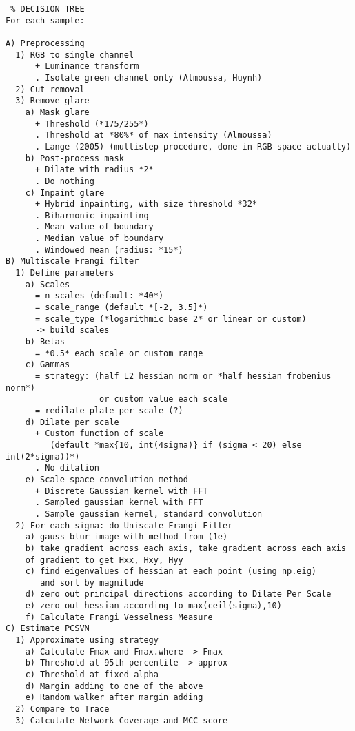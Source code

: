     \begin{spacing}{1}
    \begin{small}
    \begin{verbatim} % DECISION TREE
For each sample:

A) Preprocessing
  1) RGB to single channel
      + Luminance transform
      . Isolate green channel only (Almoussa, Huynh)
  2) Cut removal
  3) Remove glare 
    a) Mask glare
      + Threshold (*175/255*)
      . Threshold at *80%* of max intensity (Almoussa)
      . Lange (2005) (multistep procedure, done in RGB space actually)
    b) Post-process mask
      + Dilate with radius *2*
      . Do nothing
    c) Inpaint glare
      + Hybrid inpainting, with size threshold *32*
      . Biharmonic inpainting
      . Mean value of boundary 
      . Median value of boundary 
      . Windowed mean (radius: *15*)
B) Multiscale Frangi filter
  1) Define parameters
    a) Scales
      = n_scales (default: *40*)
      = scale_range (default *[-2, 3.5]*)
      = scale_type (*logarithmic base 2* or linear or custom)
      -> build scales
    b) Betas
      = *0.5* each scale or custom range
    c) Gammas
      = strategy: (half L2 hessian norm or *half hessian frobenius norm*)
                   or custom value each scale
      = redilate plate per scale (?)
    d) Dilate per scale 
      + Custom function of scale
         (default *max{10, int(4sigma)} if (sigma < 20) else int(2*sigma))*)
      . No dilation
    e) Scale space convolution method
      + Discrete Gaussian kernel with FFT
      . Sampled gaussian kernel with FFT
      . Sample gaussian kernel, standard convolution
  2) For each sigma: do Uniscale Frangi Filter
    a) gauss blur image with method from (1e)
    b) take gradient across each axis, take gradient across each axis
    of gradient to get Hxx, Hxy, Hyy
    c) find eigenvalues of hessian at each point (using np.eig)
       and sort by magnitude 
    d) zero out principal directions according to Dilate Per Scale
    e) zero out hessian according to max(ceil(sigma),10)
    f) Calculate Frangi Vesselness Measure
C) Estimate PCSVN
  1) Approximate using strategy
    a) Calculate Fmax and Fmax.where -> Fmax
    b) Threshold at 95th percentile -> approx
    c) Threshold at fixed alpha
    d) Margin adding to one of the above
    e) Random walker after margin adding
  2) Compare to Trace
  3) Calculate Network Coverage and MCC score
\end{verbatim}
    \end{small}
\end{spacing}


